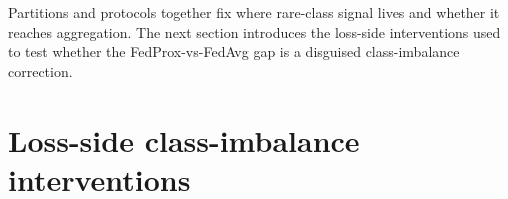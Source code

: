 \documentclass[11pt,a4paper]{report}
\begin{document}
Partitions and protocols together fix where rare-class signal lives and
whether it reaches aggregation. The next section introduces the loss-side
interventions used to test whether the FedProx-vs-FedAvg gap is a
disguised class-imbalance correction.

\begin{table}[H]
\centering
\small
\caption{Four-condition decomposition design (L4, two-client, Regime~B,
$E_{\textrm{straggler}} = 5$ on Client~1, $n = 3$ matched seeds per
cell). Holding the partition and schedule fixed across all four cells
isolates the optimiser-vs-protocol contribution. The design omits the
FedAvg + $\gamma$-inexact cell, so the $\gamma$-inexact attribution is
to the FedProx + $\gamma$-inexact \emph{protocol} rather than to
$\gamma$-inexact acceptance as a standalone universal mechanism.}
\label{tab:four-condition-design}
\end{table}

\section{Loss-side class-imbalance interventions}
\label{sec:method-losses}
\end{document}
